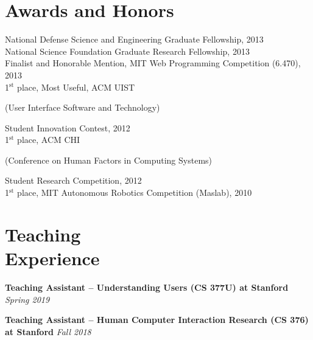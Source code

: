 \documentclass[margin,line]{resume}
\begin{document}
\begin{resume}

\section{\mysidestyle Awards and Honors}

National Defense Science and Engineering Graduate Fellowship, 2013\\ %
National Science Foundation Graduate Research Fellowship, 2013\\ %
Finalist and Honorable Mention, MIT Web Programming Competition (6.470), 2013\\ %
1$^{\textrm{st}}$ place, Most Useful, ACM UIST \begin{small}(User Interface Software and Technology)\end{small} Student Innovation Contest, 2012\\
1$^{\textrm{st}}$ place, ACM CHI \begin{small}(Conference on Human Factors in Computing Systems)\end{small} Student Research Competition, 2012\\
1$^{\textrm{st}}$ place, MIT Autonomous Robotics Competition (Maslab), 2010

\section{\mysidestyle Teaching\\Experience}

\textbf{Teaching Assistant -- Understanding Users (CS 377U) at Stanford} \hfill \textsl{Spring 2019} \\

\vspace{-8mm}

\textbf{Teaching Assistant -- Human Computer Interaction Research (CS 376) at Stanford} \hfill \textsl{Fall 2018} \\


\end{resume}
\end{document}
